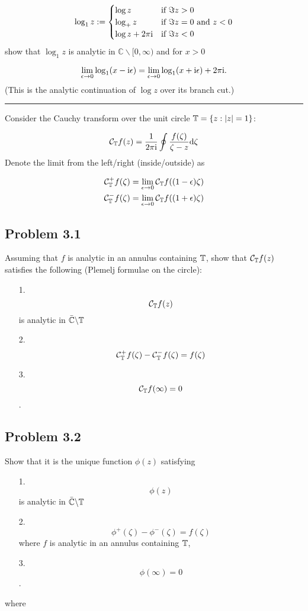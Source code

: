 \documentclass[12pt,a4paper]{article}
\def\D{ {\rm d} }
\def\I{ {\rm i} }
\def\C{ {\mathbb C} }
\def\CC{ {\cal C} }
\begin{document}
\[
\log_1  z := \begin{cases}
	\log z & \text{if } \Im z > 0 \\
	\log_+ z & \text{if } \Im z = 0 \text{ and } z <  0	 \\
	\log z + 2 \pi \I & \text{if } \Im z < 0
	\end{cases}
\]
show that $\log_1 z$ is analytic in $\C \backslash [0,\infty)$ and for $x > 0$

\[
	\lim_{\epsilon \rightarrow 0} \log_1 (x- \I \epsilon) = \lim_{\epsilon \rightarrow 0} \log_1 (x+ \I \epsilon) + 2 \pi \I.
\]
(This is the analytic continuation of $\log z$ over its branch cut.)

\rule{\textwidth}{1pt}
Consider the Cauchy transform over the unit circle ${\Bbb T} = \{ z : |z| = 1\}$:

\[
\CC_{\Bbb T} f(z) = {1 \over 2 \pi \I} \oint {f(\zeta) \over \zeta - z} \D \zeta
\]
Denote the limit from the left/right (inside/outside) as


\begin{align*}
\CC_{\Bbb T}^+f (\zeta) & = \lim_{\epsilon \rightarrow 0} \CC_{\Bbb T} f((1-\epsilon) \zeta) \\
\CC_{\Bbb T}^-f (\zeta) & = \lim_{\epsilon \rightarrow 0} \CC_{\Bbb T} f((1+\epsilon) \zeta)
\end{align*}
\subsection{Problem 3.1}
Assuming that $f$ is analytic in an annulus containing ${\Bbb T}$, show that $\CC_{\Bbb T} f(z)$ satisfies the following (Plemelj formulae on the circle):

\begin{itemize}
\item[1. ] \[
\CC_{\Bbb T} f(z)
\]
is analytic in $\bar\C \backslash {\Bbb T}$


\item[2. ] \[
\CC_{\Bbb T}^+ f(\zeta) - \CC_{\Bbb T}^- f(\zeta) = f(\zeta)
\]

\item[3. ] \[
\CC_{\Bbb T} f(\infty) = 0
\]
.

\end{itemize}
\subsection{Problem 3.2}
Show that it is the unique function $\phi(z)$ satisfying

\begin{itemize}
\item[1. ] \[
\phi(z)
\]
is analytic in $\bar\C \backslash {\Bbb T}$


\item[2. ] \[
\phi^+(\zeta) -\phi^-(\zeta) = f(\zeta)
\]
where $f$ is analytic in an annulus containing ${\Bbb T}$,


\item[3. ] \[
\phi(\infty) = 0
\]
.

\end{itemize}
where
\end{document}
